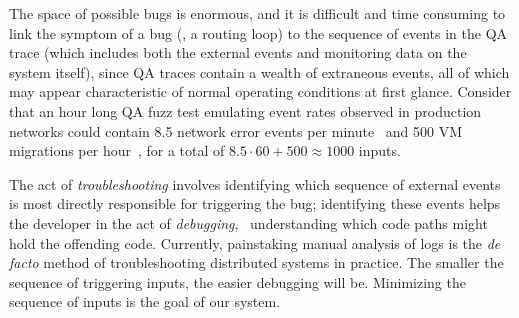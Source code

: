 The space of possible bugs is enormous, and it is difficult and time
consuming to link the
symptom of a bug (\eg, a routing loop) to the sequence of events in the QA
trace (which includes both the external events and monitoring data on the
system itself), since QA traces contain a wealth
of extraneous events, all of which may appear characteristic of normal
operating conditions at first glance. Consider that an hour long QA fuzz test
emulating event rates observed in production networks could contain 8.5 network error events per
minute~\cite{Greenberg:2009:VSF:1592568.1592576} and 500 VM migrations per
hour~\cite{Soundararajan:2010:CBS:1899928.1899941},
for a total of $8.5 \cdot 60 + 500 \approx 1000$ inputs.

The act of {\em troubleshooting} involves identifying which sequence of
external events is most directly responsible for triggering the bug;
identifying these events helps the developer in the act of {\em debugging},
\ie~understanding which code paths might
hold the offending code. Currently, painstaking manual analysis of logs is the {\em de facto} method of troubleshooting distributed systems in practice.
The smaller the sequence of triggering inputs, the easier debugging will
be. Minimizing the sequence of inputs is the goal of our system.

